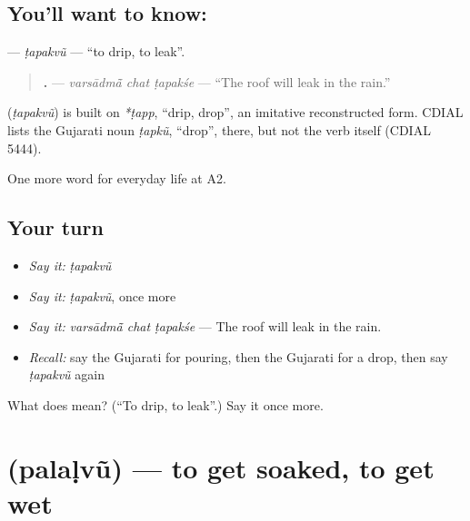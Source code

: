 \subsection*{You'll want to know: }
\textbf{} — \emph{ṭapakvũ} — \textquotedblleft{}to drip, to leak\textquotedblright{}.

\begin{quote}
\textbf{  .} — \emph{varsādmā̃ chat ṭapakśe} — \textquotedblleft{}The roof will leak in the rain.\textquotedblright{}
\end{quote}

\begin{cousinweb}
\textbf{} (\emph{ṭapakvũ}) is built on \emph{*ṭapp}, \textquotedblleft{}drip, drop\textquotedblright{}, an imitative reconstructed form. CDIAL lists the Gujarati noun \emph{ṭapkũ}, \textquotedblleft{}drop\textquotedblright{}, there, but not the verb itself (CDIAL 5444).
\end{cousinweb}

\begin{grammarlens}[title={What you've built}]
One more word for everyday life at A2.
\end{grammarlens}

\subsection*{Your turn}
\begin{itemize}
\raggedright
  \item \emph{Say it:} \emph{ṭapakvũ}
  \item \emph{Say it:} \emph{ṭapakvũ}, once more
  \item \emph{Say it:} \emph{varsādmā̃ chat ṭapakśe} — The roof will leak in the rain.
  \item \emph{Recall:} say the Gujarati for pouring, then the Gujarati for a drop, then say \emph{ṭapakvũ} again
\end{itemize}

\begin{tcolorbox}[breakable,colback=teal!4,colframe=teal!35!black,title={Before you move on}]
What does  mean? (\textquotedblleft{}To drip, to leak\textquotedblright{}.) Say it once more.
\end{tcolorbox}
\section[\texorpdfstring{\gu{પલળવું} (palaḷvũ)}{પલળવું (palaḷvũ)}]{ (palaḷvũ) — to get soaked, to get wet}

